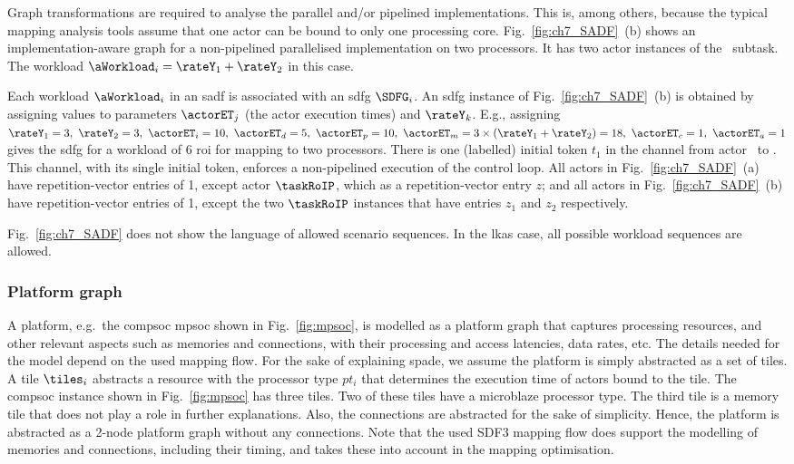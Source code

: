 Graph transformations are required to analyse the parallel and/or pipelined implementations.
This is, among others, because the typical mapping analysis tools assume that one actor can be bound to only one processing core.   Fig.~\ref{fig:ch7_SADF}~(b) shows an implementation-aware graph for a non-pipelined parallelised implementation on two processors. It has two actor instances of the \taskRoIP\ subtask. The workload $\aWorkload_i=\rateY_{1}+\rateY_2$ in this case.

Each workload $\aWorkload_i$ in an \gls{sadf} is associated with an \gls{sdfg} $\SDFG_i$. 
An \gls{sdfg} instance of Fig.~\ref{fig:ch7_SADF}~(b) is obtained by assigning values to parameters $\actorET_j$ (the actor execution times) and $\rateY_k$. 
E.g., assigning $\rateY_1=3,\ \rateY_2=3,\ \actorET_i=10,\ \actorET_d=5,\ \actorET_p=10,\ \actorET_m=3\times(\rateY_1+\rateY_2)=18,\ \actorET_c=1,\ \actorET_a=1$ gives the \gls{sdfg} for a workload of 6 \gls{roi} for mapping to two processors.
There is one (labelled) initial token $t_1$ in the channel from actor \taskA\ to \taskISP. This channel, with its single initial token, enforces a non-pipelined execution of the control loop. 
All actors in Fig.~\ref{fig:ch7_SADF}~(a) have repetition-vector entries of 1, except actor $\taskRoIP$, which as a repetition-vector entry $z$; and all actors in Fig.~\ref{fig:ch7_SADF}~(b) have repetition-vector entries of 1, except the two $\taskRoIP$ instances that have entries $z_1$ and $z_2$ respectively.

Fig.~\ref{fig:ch7_SADF} does not show the language of allowed scenario sequences. In the \gls{lkas} case, all possible workload sequences are allowed.

\subsubsection{Platform graph}
A platform, e.g.\ the \gls{compsoc} \gls{mpsoc} shown in Fig.~\ref{fig:mpsoc}, is modelled as a platform graph that captures processing resources, and other relevant aspects such as memories and connections, with their processing and access latencies, data rates, etc. The details needed for the model depend on the used mapping flow.
For the sake of explaining \gls{spade}, we assume the platform is simply abstracted as a set of tiles.
A tile $\tiles_i$ abstracts a resource with the processor type $pt_i$ that determines the execution time of actors bound to the tile.
The \gls{compsoc} instance shown in Fig.~\ref{fig:mpsoc} has three tiles. Two of these tiles have a microblaze processor type. The third tile is a memory tile that does not play a role in further explanations. Also, the connections are abstracted for the sake of simplicity. Hence, the platform is abstracted as a 2-node platform graph without any connections. Note that the used SDF3 mapping flow does support the modelling of memories and connections, including their timing, and takes these into account in the mapping optimisation. 

